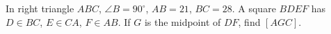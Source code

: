 In right triangle $ABC$, $\angle B=90^\circ$, $AB=21$, $BC=28$. A square $BDEF$ has $D\in BC$, $E\in CA$, $F\in AB$. If $G$ is the midpoint of $DF$, find $[AGC]$.
